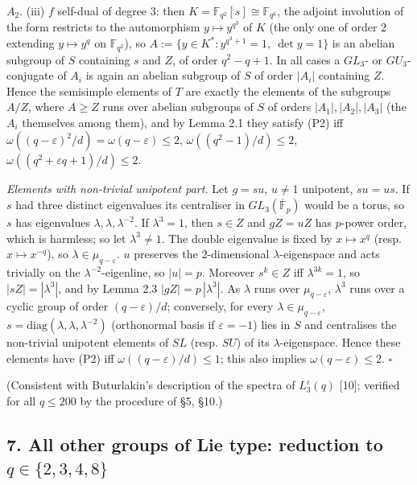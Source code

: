 \documentclass[11pt,a4paper]{article}
\begin{document}
\(A_2\). (iii) \(f\) self-dual of degree \(3\): then
\(K=\mathbb F_{q^2}[s]\cong\mathbb F_{q^6}\), the adjoint involution of
the form restricts to the automorphism \(y\mapsto y^{q^3}\) of \(K\)
(the only one of order \(2\) extending \(y\mapsto y^q\) on
\(\mathbb F_{q^2}\)), so \(A:=\{y\in K^*: y^{q^3+1}=1,\ \det y=1\}\) is
an abelian subgroup of \(S\) containing \(s\) and \(Z\), of order
\(q^2-q+1\). In all cases a \(GL_3\)- or \(GU_3\)-conjugate of \(A_i\)
is again an abelian subgroup of \(S\) of order \(|A_i|\) containing
\(Z\). Hence the semisimple elements of \(T\) are exactly the elements
of the subgroups \(A/Z\), where \(A\ge Z\) runs over abelian subgroups
of \(S\) of orders \(|A_1|,|A_2|,|A_3|\) (the \(A_i\) themselves among
them), and by Lemma 2.1 they satisfy (P2) iff
\(\omega((q-\varepsilon)^2/d)=\omega(q-\varepsilon)\le2\),
\(\omega((q^2-1)/d)\le2\), \(\omega((q^2+\varepsilon q+1)/d)\le 2\).

\emph{Elements with non-trivial unipotent part.} Let \(g=su\), \(u\ne1\)
unipotent, \(su=us\). If \(s\) had three distinct eigenvalues its
centraliser in \(GL_3(\overline{\mathbb F}_p)\) would be a torus, so
\(s\) has eigenvalues \(\lambda,\lambda,\lambda^{-2}\). If
\(\lambda^3=1\), then \(s\in Z\) and \(gZ=uZ\) has \(p\)-power order,
which is harmless; so let \(\lambda^3\ne1\). The double eigenvalue is
fixed by \(x\mapsto x^q\) (resp. \(x\mapsto x^{-q}\)), so
\(\lambda\in\mu_{q-\varepsilon}\). \(u\) preserves the \(2\)-dimensional
\(\lambda\)-eigenspace and acts trivially on the
\(\lambda^{-2}\)-eigenline, so \(|u|=p\). Moreover \(s^k\in Z\) iff
\(\lambda^{3k}=1\), so \(|sZ|=|\lambda^3|\), and by Lemma 2.3
\(|gZ|=p\,|\lambda^3|\). As \(\lambda\) runs over
\(\mu_{q-\varepsilon}\), \(\lambda^3\) runs over a cyclic group of order
\((q-\varepsilon)/d\); conversely, for every
\(\lambda\in\mu_{q-\varepsilon}\),
\(s=\mathrm{diag}(\lambda,\lambda,\lambda^{-2})\) (orthonormal basis if
\(\varepsilon=-1\)) lies in \(S\) and centralises the non-trivial
unipotent elements of \(SL\) (resp. \(SU\)) of its
\(\lambda\)-eigenspace. Hence these elements have (P2) iff
\(\omega((q-\varepsilon)/d)\le1\); this also implies
\(\omega(q-\varepsilon)\le2\). \(\square\)

(Consistent with Buturlakin's description of the spectra of
\(L_3^\varepsilon(q)\) {[}10{]}; verified for all \(q\le 200\) by the
procedure of §5, §10.)

\subsection{\texorpdfstring{7. All other groups of Lie type: reduction
to
\(q\in\{2,3,4,8\}\)}{7. All other groups of Lie type: reduction to q\textbackslash in\textbackslash\{2,3,4,8\textbackslash\}}}\label{all-other-groups-of-lie-type-reduction-to-qin2348}
\end{document}
